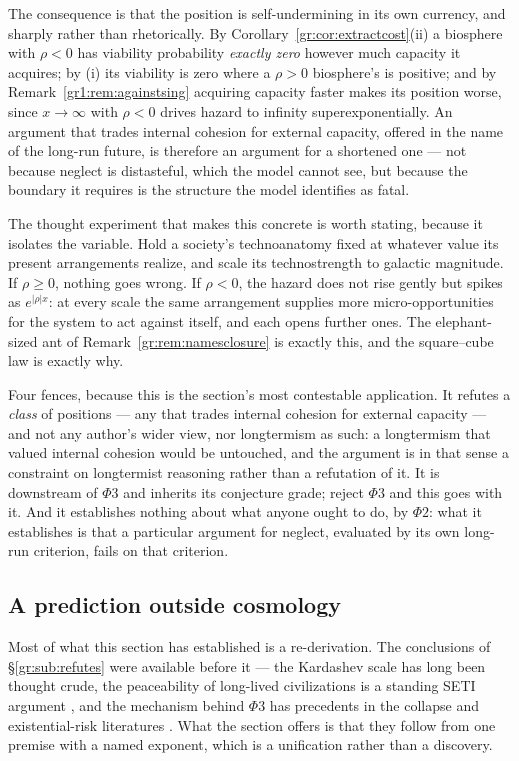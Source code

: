 \documentclass[11pt]{article}
\numberwithin{equation}{section}
\theoremstyle{plain}
\theoremstyle{definition}
\theoremstyle{remark}
\begin{document}
The consequence is that the position is self-undermining in its own
currency, and sharply rather than rhetorically. By
Corollary~\ref{gr:cor:extractcost}(ii) a biosphere with $\rho<0$ has
viability probability \emph{exactly zero} however much capacity it
acquires; by (i) its viability is zero where a $\rho>0$ biosphere's is
positive; and by
Remark~\ref{gr1:rem:againstsing} acquiring capacity faster makes its
position worse, since $x\to\infty$ with $\rho<0$ drives hazard to
infinity superexponentially. An argument that trades internal cohesion
for external capacity, offered in the name of the long-run future, is
therefore an argument for a shortened one --- not because neglect is
distasteful, which the model cannot see, but because the boundary it
requires is the structure the model identifies as fatal.

The thought experiment that makes this concrete is worth stating,
because it isolates the variable. Hold a society's technoanatomy fixed
at whatever value its present arrangements realize, and scale its
technostrength to galactic magnitude. If $\rho\ge0$, nothing goes
wrong. If $\rho<0$, the hazard does not rise gently but spikes as
$e^{|\rho|x}$: at every scale the same arrangement supplies more
micro-opportunities for the system to act against itself, and each
opens further ones. The elephant-sized ant of
Remark~\ref{gr:rem:namesclosure} is exactly this, and the square--cube
law is exactly why.

Four fences, because this is the section's most contestable
application. It refutes a \emph{class} of positions --- any that trades
internal cohesion for external capacity --- and not any author's wider
view, nor longtermism as such: a longtermism that valued internal
cohesion would be untouched, and the argument is in that sense a
constraint on longtermist reasoning rather than a refutation of it. It is downstream of $\Phi3$ and inherits its conjecture grade;
reject $\Phi3$ and this goes with it. And it establishes nothing about
what anyone ought to do, by $\Phi2$: what it establishes is that a
particular argument for neglect, evaluated by its own long-run
criterion, fails on that criterion.

\subsection{A prediction outside cosmology}\label{gr:sub:crossdomain}

Most of what this section has established is a re-derivation. The
conclusions of \S\ref{gr:sub:refutes} were available before it --- the
Kardashev scale has long been thought crude, the peaceability of
long-lived civilizations is a standing SETI argument
\cite{Cooper19}, and the mechanism behind $\Phi3$ has precedents in
the collapse and existential-risk literatures
\cite{Tainter88,Bostrom19}. What the section offers is that they follow
from one premise with a named exponent, which is a unification rather
than a discovery.
\end{document}

